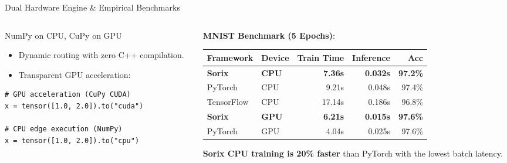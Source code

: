 \documentclass[11pt,aspectratio=169]{beamer}
\begin{document}
\begin{frame}[fragile]{Dual Hardware Engine \& Empirical Benchmarks}
  \begin{columns}[T,onlytextwidth]
    \begin{column}{0.44\textwidth}
      \begin{block}{NumPy on CPU, CuPy on GPU}
        \begin{itemize}
          \item Dynamic routing with zero C++ compilation.
          \item Transparent GPU acceleration:
        \end{itemize}
        \begin{lstlisting}
# GPU acceleration (CuPy CUDA)
x = tensor([1.0, 2.0]).to("cuda")

# CPU edge execution (NumPy)
x = tensor([1.0, 2.0]).to("cpu")
        \end{lstlisting}
      \end{block}
    \end{column}

    \begin{column}{0.54\textwidth}
      \textbf{MNIST Benchmark (5 Epochs)}:
      \vspace{0.2em}
      \begin{table}[ht]
        \centering
        \scriptsize
        \setlength{\tabcolsep}{3.5pt}
        \begin{tabular}{llrrr}
          \toprule
          \textbf{Framework} & \textbf{Device} & \textbf{Train Time} & \textbf{Inference} & \textbf{Acc} \\
          \midrule
          \rowcolor{cvlightblue!35}
          \textbf{Sorix} & \textbf{CPU} & \textbf{7.36s} & \textbf{0.032s} & \textbf{97.2\%} \\
          PyTorch & CPU & 9.21s & 0.048s & 97.4\% \\
          TensorFlow & CPU & 17.14s & 0.186s & 96.8\% \\
          \addlinespace
          \rowcolor{cvred!15}
          \textbf{Sorix} & \textbf{GPU} & \textbf{6.21s} & \textbf{0.015s} & \textbf{97.6\%} \\
          PyTorch & GPU & 4.04s & 0.025s & 97.6\% \\
          \bottomrule
        \end{tabular}
      \end{table}
      \footnotesize \textbf{Sorix CPU training is 20\% faster} than PyTorch with the lowest batch latency.
    \end{column}
  \end{columns}
\end{frame}
\end{document}
